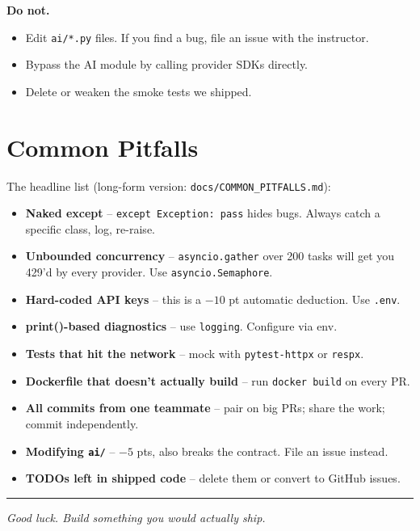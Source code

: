 \documentclass[11pt,a4paper]{article}
\newcommand{\warn}[1]{\textcolor{accent2}{\textbf{#1}}}
\begin{document}
\textbf{Do not.}
\begin{itemize}[topsep=2pt,itemsep=1pt]
  \item Edit \texttt{ai/*.py} files. If you find a bug, file an issue with the instructor.
  \item Bypass the AI module by calling provider SDKs directly.
  \item Delete or weaken the smoke tests we shipped.
\end{itemize}

\section{Common Pitfalls}
The headline list (long-form version: \texttt{docs/COMMON\_PITFALLS.md}):

\begin{itemize}[topsep=2pt,itemsep=1pt]
  \item \warn{Naked except} -- \texttt{except Exception: pass} hides bugs. Always catch a specific class, log, re-raise.
  \item \warn{Unbounded concurrency} -- \texttt{asyncio.gather} over 200 tasks will get you 429'd by every provider. Use \texttt{asyncio.Semaphore}.
  \item \warn{Hard-coded API keys} -- this is a $-10$ pt automatic deduction. Use \texttt{.env}.
  \item \warn{print()-based diagnostics} -- use \texttt{logging}. Configure via env.
  \item \warn{Tests that hit the network} -- mock with \texttt{pytest-httpx} or \texttt{respx}.
  \item \warn{Dockerfile that doesn't actually build} -- run \texttt{docker build} on every PR.
  \item \warn{All commits from one teammate} -- pair on big PRs; share the work; commit independently.
  \item \warn{Modifying \texttt{ai/}} -- $-5$ pts, also breaks the contract. File an issue instead.
  \item \warn{TODOs left in shipped code} -- delete them or convert to GitHub issues.
\end{itemize}

\vspace{1.4em}
\hrule\vspace{0.6em}
\noindent\small\textit{Good luck. Build something you would actually ship.}
\end{document}
